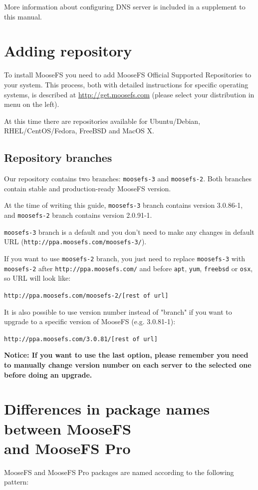 \documentclass[a4paper,11pt,english]{report}
\def\code#1{\texttt{#1}}
\begin{document}
			More information about configuring DNS server is included in a supplement to this manual.
			
		\section{Adding repository}
			To install MooseFS you need to add MooseFS Official Supported Repositories to your system. This process, both with detailed instructions for specific operating systems, is described at \url{http://get.moosefs.com} (please select your distribution in menu on the left).
			
			At this time there are repositories available for Ubuntu/Debian, RHEL/CentOS/Fedora, FreeBSD and MacOS X.
			
			\subsection{Repository branches}
				Our repository contains two branches: \code{moosefs-3} and \code{moosefs-2}. Both branches contain stable and production-ready MooseFS version.
				
				At the time of writing this guide, \code{moosefs-3} branch contains version 3.0.86-1, and \code{moosefs-2} branch contains version 2.0.91-1.
				
				\code{moosefs-3} branch is a default and you don't need to make any changes in default URL (\code{http://ppa.moosefs.com/moosefs-3/}).
				
				If you want to use \code{moosefs-2} branch, you just need to replace \code{moosefs-3} with \code{moosefs-2} after \code{http://ppa.moosefs.com/} and before \code{apt}, \code{yum}, \code{freebsd} or \code{osx}, so URL will look like:
				
				\code{http://ppa.moosefs.com/moosefs-2/[rest of url]}
				
				It is also possible to use version number instead of "branch" if you want to upgrade to a specific version of MooseFS (e.g. 3.0.81-1):
				
				\code{http://ppa.moosefs.com/3.0.81/[rest of url]}
				
				\textbf{Notice: If you want to use the last option, please remember you need to manually change version number on each server to the selected one before doing an upgrade.}
				
		\section{Differences in package names between MooseFS \\ and MooseFS Pro}
			MooseFS and MooseFS Pro packages are named according to the following pattern:
			
\end{document}
